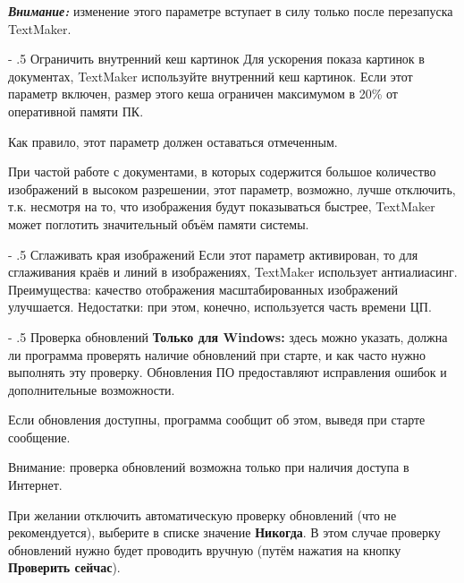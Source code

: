 ﻿\documentclass[a4paper,10pt]{article}
\makeatletter
\renewcommand\paragraph{%
   \@startsection{paragraph}{4}{0mm}%
      {-\baselineskip}%
      {.5\baselineskip}%
      {\normalfont\normalsize\bfseries}}
\makeatother
\begin{document}
 \textbf{\textit{Внимание:}} изменение этого параметре вступает в силу только после перезапуска TextMaker.
 
 \paragraph{Ограничить внутренний кеш картинок}
 Для ускорения показа картинок в документах, TextMaker используйте внутренний кеш картинок. Если этот параметр включен, размер этого кеша ограничен максимумом в 20\% от оперативной памяти ПК.
 
 Как правило, этот параметр должен оставаться отмеченным.
 
 При частой работе с документами, в которых содержится большое количество изображений в высоком разрешении, этот параметр, возможно, лучше отключить, т.к. несмотря на то, что изображения будут показываться быстрее, TextMaker может поглотить значительный объём памяти системы.
 
 \paragraph{Сглаживать края изображений}
 Если этот параметр активирован, то для сглаживания краёв и линий в изображениях, TextMaker использует антиалиасинг. Преимущества: качество отображения масштабированных изображений улучшается. Недостатки: при этом, конечно, используется часть времени ЦП.
 
 \paragraph{Проверка обновлений}
 \textbf{Только для Windows:} здесь можно указать, должна ли программа проверять наличие обновлений при старте, и как часто нужно выполнять эту проверку. Обновления ПО предоставляют исправления ошибок и дополнительные возможности.
 
 Если обновления доступны, программа сообщит об этом, выведя при старте сообщение.
 
 Внимание: проверка обновлений возможна только при наличия доступа в Интернет.
 
 При желании отключить автоматическую проверку обновлений (что не рекомендуется), выберите в списке значение \textbf{Никогда}. В этом случае проверку обновлений нужно будет проводить вручную (путём нажатия на кнопку \textbf{Проверить сейчас}).
 
\end{document}
